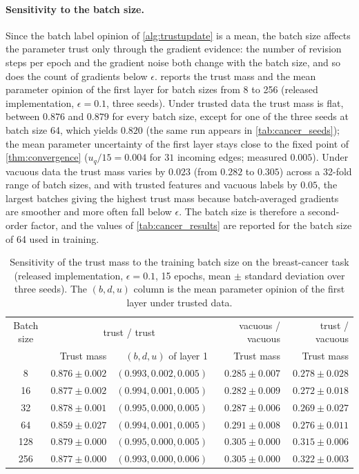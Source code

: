 \paragraph*{Sensitivity to the batch size.} Since the batch label opinion of \cref{alg:trustupdate} is a mean, the batch size affects the parameter trust only through the gradient evidence: the number of revision steps per epoch and the gradient noise both change with the batch size, and so does the count of gradients below $\epsilon$.  reports the trust mass and the mean parameter opinion of the first layer for batch sizes from 8 to 256 (released implementation, $\epsilon = 0.1$, three seeds). Under trusted data the trust mass is flat, between $0.876$ and $0.879$ for every batch size, except for one of the three seeds at batch size 64, which yields $0.820$ (the same run appears in \cref{tab:cancer_seeds}); the mean parameter uncertainty of the first layer stays close to the fixed point of \cref{thm:convergence} ($u_q/15 = 0.004$ for $31$ incoming edges; measured $0.005$). Under vacuous data the trust mass varies by $0.023$ (from $0.282$ to $0.305$) across a 32-fold range of batch sizes, and with trusted features and vacuous labels by $0.05$, the largest batches giving the highest trust mass because batch-averaged gradients are smoother and more often fall below $\epsilon$. The batch size is therefore a second-order factor, and the values of \cref{tab:cancer_results} are reported for the batch size of 64 used in training.

\begin{table}[ht]
\centering
\begin{tabular}{crrrr}
\hline
Batch size & \multicolumn{2}{c}{trust / trust} & vacuous / vacuous & trust / vacuous \\
 & Trust mass & $(b, d, u)$ of layer 1 & Trust mass & Trust mass \\
\hline
8   & $0.876 \pm 0.002$ & $(0.993, 0.002, 0.005)$ & $0.285 \pm 0.007$ & $0.278 \pm 0.028$ \\
16  & $0.877 \pm 0.002$ & $(0.994, 0.001, 0.005)$ & $0.282 \pm 0.009$ & $0.272 \pm 0.018$ \\
32  & $0.878 \pm 0.001$ & $(0.995, 0.000, 0.005)$ & $0.287 \pm 0.006$ & $0.269 \pm 0.027$ \\
64  & $0.859 \pm 0.027$ & $(0.994, 0.001, 0.005)$ & $0.291 \pm 0.008$ & $0.276 \pm 0.011$ \\
128 & $0.879 \pm 0.000$ & $(0.995, 0.000, 0.005)$ & $0.305 \pm 0.000$ & $0.315 \pm 0.006$ \\
256 & $0.877 \pm 0.000$ & $(0.993, 0.000, 0.006)$ & $0.305 \pm 0.000$ & $0.322 \pm 0.003$ \\
\hline
\end{tabular}
\caption{Sensitivity of the trust mass to the training batch size on the breast-cancer task (released implementation, $\epsilon = 0.1$, 15 epochs, mean $\pm$ standard deviation over three seeds). The $(b, d, u)$ column is the mean parameter opinion of the first layer under trusted data.}
\label{tab:cancer_batch}
\end{table}

